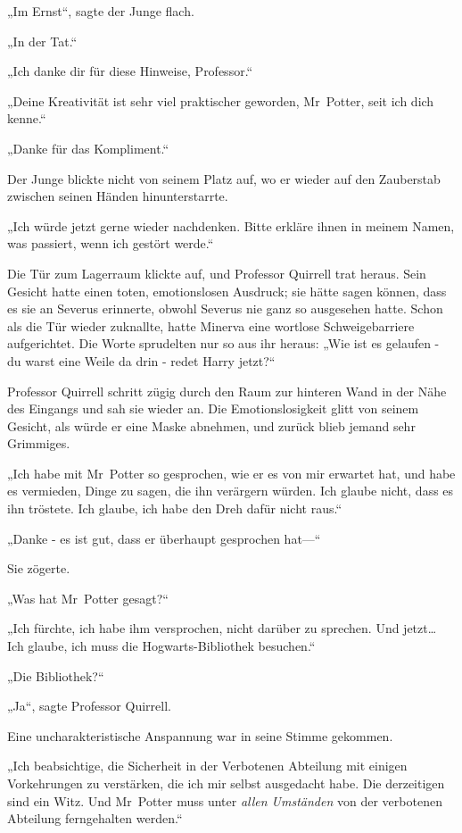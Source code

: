 {„Im Ernst“, sagte der Junge flach.

„In der Tat.“

„Ich danke dir für diese Hinweise, Professor.“

„Deine Kreativität ist sehr viel praktischer geworden, Mr~Potter, seit ich dich kenne.“

„Danke für das Kompliment.“

Der Junge blickte nicht von seinem Platz auf, wo er wieder auf den Zauberstab zwischen seinen Händen hinunterstarrte.

„Ich würde jetzt gerne wieder nachdenken. Bitte erkläre ihnen in meinem Namen, was passiert, wenn ich gestört werde.“

Die Tür zum Lagerraum klickte auf, und Professor Quirrell trat heraus. Sein Gesicht hatte einen toten, emotionslosen Ausdruck; sie hätte sagen können, dass es sie an Severus erinnerte, obwohl Severus nie ganz so ausgesehen hatte. Schon als die Tür wieder zuknallte, hatte Minerva eine wortlose Schweigebarriere aufgerichtet. Die Worte sprudelten nur so aus ihr heraus: „Wie ist es gelaufen - du warst eine Weile da drin - redet Harry jetzt?“

Professor Quirrell schritt zügig durch den Raum zur hinteren Wand in der Nähe des Eingangs und sah sie wieder an. Die Emotionslosigkeit glitt von seinem Gesicht, als würde er eine Maske abnehmen, und zurück blieb jemand sehr Grimmiges.

„Ich habe mit Mr~Potter so gesprochen, wie er es von mir erwartet hat, und habe es vermieden, Dinge zu sagen, die ihn verärgern würden. Ich glaube nicht, dass es ihn tröstete. Ich glaube, ich habe den Dreh dafür nicht raus.“

„Danke - es ist gut, dass er überhaupt gesprochen hat—“

Sie zögerte.

„Was hat Mr~Potter gesagt?“

„Ich fürchte, ich habe ihm versprochen, nicht darüber zu sprechen. Und jetzt… Ich glaube, ich muss die Hogwarts-Bibliothek besuchen.“

„Die Bibliothek?“

„Ja“, sagte Professor Quirrell.

Eine uncharakteristische Anspannung war in seine Stimme gekommen.

„Ich beabsichtige, die Sicherheit in der Verbotenen Abteilung mit einigen Vorkehrungen zu verstärken, die ich mir selbst ausgedacht habe. Die derzeitigen sind ein Witz. Und Mr~Potter muss unter \emph{allen Umständen} von der verbotenen Abteilung ferngehalten werden.“

}
